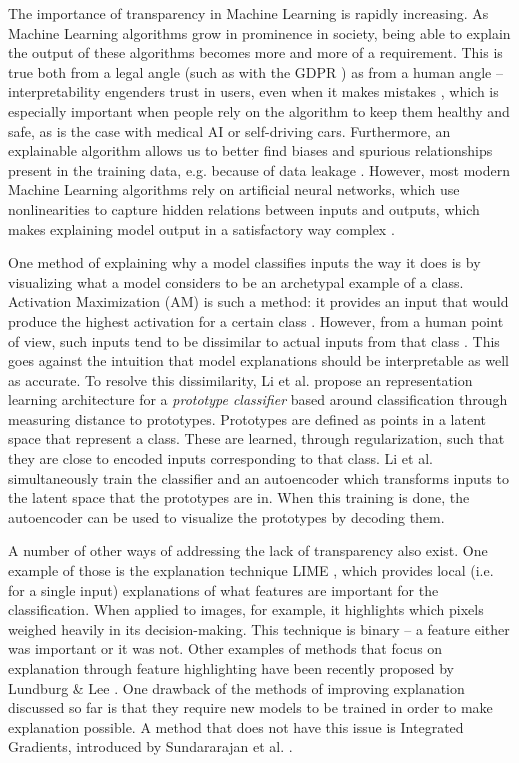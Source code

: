 The importance of transparency in Machine Learning is rapidly increasing. As Machine Learning algorithms grow in prominence in society, being able to explain the output of these algorithms becomes more and more of a requirement. This is true both from a legal angle (such as with the GDPR \citep{gdprart}) as from a human angle -- interpretability engenders trust in users, even when it makes mistakes \citep{automtrust}, which is especially important when people rely on the algorithm to keep them healthy and safe, as is the case with medical AI or self-driving cars. Furthermore, an explainable algorithm allows us to better find biases and spurious relationships present in the training data, e.g. because of data leakage \citep{dataleakage}. However, most modern Machine Learning algorithms rely on artificial neural networks, which use nonlinearities to capture hidden relations between inputs and outputs, which makes explaining model output in a satisfactory way complex \citep{NNblackboxexplanation}.

One method of explaining why a model classifies inputs the way it does is by visualizing what a model considers to be an archetypal example of a class. Activation Maximization (AM) \citep{activationmaximization} is such a method: it provides an input that would produce the highest activation for a certain class . However, from a human point of view, such inputs tend to be dissimilar to actual inputs from that class  \citep{activationmaximization}. This goes against the intuition that model explanations should be interpretable as well as accurate. To resolve this dissimilarity, Li et al. \citep{li2018deep} propose an representation learning architecture for a \textit{prototype classifier} based around classification through measuring distance to prototypes. Prototypes are defined as points in a latent space that represent a class. These are learned, through regularization, such that they are close to encoded inputs corresponding to that class. Li et al. simultaneously train the classifier and an autoencoder \citep{autoencoderpaper} which transforms inputs to the latent space that the prototypes are in. When this training is done, the autoencoder can be used to visualize the prototypes by decoding them.

A number of other ways of addressing the lack of transparency also exist. One example of those is the explanation technique LIME \citep{LIME}, which provides local (i.e. for a single input) explanations of what features are important for the classification. When applied to images, for example, it highlights which pixels weighed heavily in its decision-making. This technique is binary -- a feature either was important or it was not. Other examples of methods that focus on explanation through feature highlighting have been recently proposed by Lundburg \& Lee \citep{featureexamplepaper1}. One drawback of the methods of improving explanation discussed so far is that they require new models to be trained in order to make explanation possible. A method that does not have this issue is Integrated Gradients, introduced by Sundararajan et al. \citep{axioms}.

